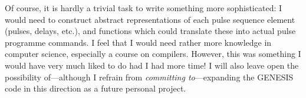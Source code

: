 Of course, it is hardly a trivial task to write something more sophisticated: I would need to construct abstract representations of each pulse sequence element (pulses, delays, etc.), and functions which could translate these into actual pulse programme commands.
I feel that I would need rather more knowledge in computer science, especially a course on compilers.
However, this was something I would have very much liked to do had I had more time!
I will also leave open the possibility of---although I refrain from \textit{committing to}---expanding the GENESIS code in this direction as a future personal project.
